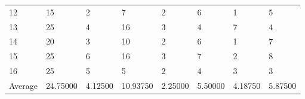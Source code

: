 \begin{table}[hbtp!]
\begin{tabular}{|llllllll|}
12                       & 15                        & 2        & 7         & 2       & 6             & 1           & 5             \\
13                       & 25                        & 4        & 16        & 3       & 4             & 7           & 4             \\
14                       & 20                        & 3        & 10        & 2       & 6             & 1           & 7             \\
15                       & 25                        & 6        & 16        & 3       & 7             & 2           & 8             \\
16                       & 25                        & 5        & 5         & 2       & 4             & 3           & 3             \\ \hline\hline
Average                  & 24.75000                  & 4.12500  & 10.93750  & 2.25000 & 5.50000       & 4.18750     & 5.87500 \\ \hline     
\end{tabular}
\end{table}


